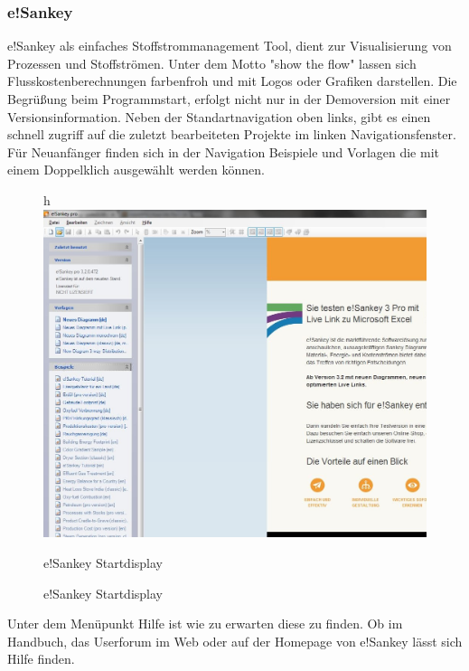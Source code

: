 \documentclass[a4paper, 12pt, twoside, BCOR=20mm, DIV=calc, abstracton, parskip=half*, toc=bibliography, toc=listof, headsepline, footsepline, headings=small, numbers=enddot]{scrreprt}
\begin{document}
\subsubsection{e!Sankey}
e!Sankey als einfaches Stoffstrommanagement Tool, dient zur Visualisierung von Prozessen und Stoffströmen. Unter dem Motto "show the flow" lassen sich Flusskostenberechnungen farbenfroh und mit Logos oder Grafiken darstellen. 
Die Begrüßung beim Programmstart, erfolgt nicht nur in der Demoversion mit einer Versionsinformation. Neben der Standartnavigation oben links, gibt es einen schnell zugriff auf die zuletzt bearbeiteten Projekte im linken Navigationsfenster. Für Neuanfänger finden sich in der Navigation Beispiele und Vorlagen die mit einem Doppelklich ausgewählt werden können.  
\begin{figure}{h}
\centering
\includegraphics[width=\textwidth]{Bild/Esankey Start 2.JPG}
\caption{e!Sankey Startdisplay}{e!Sankey Startdisplay}
\end{figure}	
Unter dem Menüpunkt Hilfe ist wie zu erwarten diese zu finden. Ob im Handbuch, das Userforum im Web oder auf der Homepage von e!Sankey lässt sich Hilfe finden. 
\end{document}
